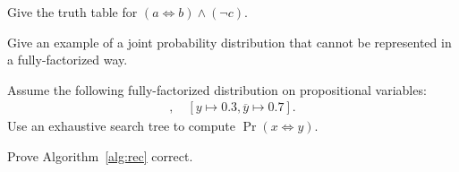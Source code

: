 \documentclass{tufte-handout}
\begin{document}


\begin{exercise}[$\star$]
Give the truth table for $(a \Leftrightarrow b) \land (\neg c).$ 
\end{exercise}
\begin{exercise}[$\star$]
    Give an example of a joint probability distribution that cannot be 
    represented in a fully-factorized way.
\end{exercise}
\begin{exercise}[$\star$]
    Assume the following fully-factorized distribution on propositional variables:
    \begin{align*}
        [x \mapsto 0.1, \overline{x} \mapsto 0.9],\quad [y \mapsto 0.3, \overline{y} \mapsto 0.7].
    \end{align*}
    Use an exhaustive search tree to compute $\Pr(x \Leftrightarrow y)$.
\end{exercise}
\begin{exercise}[$\star\star$]
    Prove Algorithm~\ref{alg:rec} correct.
\end{exercise}





\end{document}
